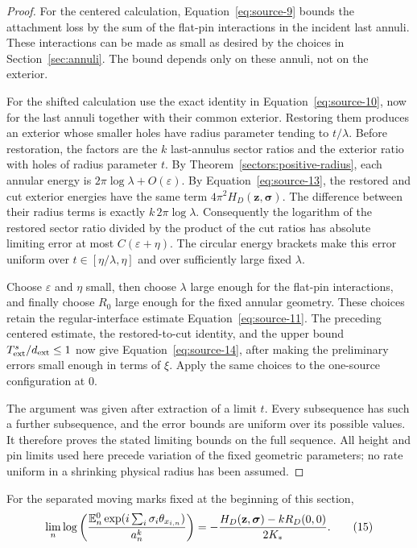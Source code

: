\begin{proof}
For the centered calculation, Equation~\eqref{eq:source-9} bounds
the attachment loss by the sum of the flat-pin interactions in
the incident last annuli.  These interactions can be made as small
as desired by the choices in Section~\ref{sec:annuli}.
The bound depends only on these annuli, not on the exterior.

For the shifted calculation use the exact identity
in Equation~\eqref{eq:source-10}, now for the last annuli together
with their common exterior.  Restoring them produces an exterior
whose smaller holes have radius parameter tending to \(t/\lambda\).
Before restoration, the factors are the \(k\) last-annulus sector
ratios and the exterior ratio with holes of radius parameter \(t\).
By Theorem~\ref{sectors:positive-radius}, each annular energy is
\(2\pi\log\lambda+O(\varepsilon)\).  By
Equation~\eqref{eq:source-13}, the restored and cut exterior energies
have the same term \(4\pi^2H_D(\mathbf z,\boldsymbol\sigma)\).
The difference between their radius terms is exactly
\(k\,2\pi\log\lambda\).  Consequently the logarithm of the
restored sector ratio divided by the product of the cut ratios
has absolute limiting error at most \(C(\varepsilon+\eta)\).
The circular energy brackets make this error uniform over
\(t\in[\eta/\lambda,\eta]\) and over sufficiently large fixed
\(\lambda\).

Choose \(\varepsilon\) and \(\eta\) small, then choose \(\lambda\)
large enough for the flat-pin interactions, and finally choose
\(R_0\) large enough for the fixed annular geometry.  These choices
retain the regular-interface estimate
Equation~\eqref{eq:source-11}.  The preceding centered estimate,
the restored-to-cut identity, and the upper bound
\(T_{\rm ext}^s/d_{\rm ext}\leq1\) now give
Equation~\eqref{eq:source-14}, after making the preliminary errors
small enough in terms of \(\xi\).  Apply the same choices to the
one-source configuration at \(0\).

The argument was given after extraction of a limit \(t\).
Every subsequence has such a further subsequence, and the error
bounds are uniform over its possible values.  It therefore proves
the stated limiting bounds on the full sequence.  All height and
pin limits used here precede variation of the fixed geometric
parameters; no rate uniform in a shrinking physical radius has
been assumed.
\end{proof}

\begin{proposition}
\label{correlations:separated}
For the separated moving marks fixed at the beginning of this section,
\begin{equation}
 \lim_n\log\left(
 \frac{\mathbb E_n^0\exp(i\sum_i\sigma_i\theta_{x_{i,n}})}{a_n^k}
 \right)
 =
 -\frac{H_D(\mathbf z,\boldsymbol\sigma)-kR_D(0,0)}
        {2K_*}.
 \tag{15}\label{eq:source-15}
\end{equation}
\end{proposition}

